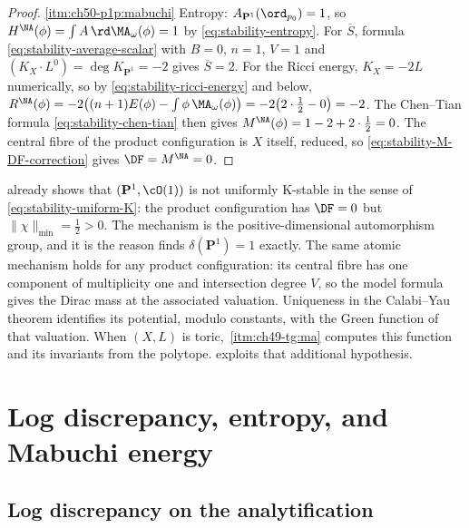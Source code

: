\begin{proof}
\cref{itm:ch50-p1p:mabuchi}  Entropy: $A_{\mathbf P^1}(\ord_{p_0})=1$, so
$H^{\NA}(\phi)=\int A\,\rd\MA_\omega(\phi)=1$ by
\eqref{eq:stability-entropy}.  For $\overline S$, formula
\eqref{eq:stability-average-scalar} with $B=0$, $n=1$, $V=1$ and
$(K_X\cdot L^{0})=\deg K_{\mathbf P^1}=-2$ gives
$\overline S=2$.  For the Ricci energy, $K_X=-2L$ numerically, so by
\eqref{eq:stability-ricci-energy} and
 below,
$R^{\NA}(\phi)=-2\bigl((n+1)E(\phi)-\int\phi\,\MA_\omega(\phi)\bigr)
=-2\bigl(2\cdot\tfrac12-0\bigr)=-2$.  The Chen--Tian formula
\eqref{eq:stability-chen-tian} then gives
$M^{\NA}(\phi)=1-2+2\cdot\tfrac12=0$.  The central fibre of the product
configuration is $X$ itself, reduced, so
\eqref{eq:stability-M-DF-correction} gives $\DF=M^{\NA}=0$.
\end{proof}

\begin{remark}
\label{rem:ch50-p1-obstruction}
 already shows that
$(\mathbf P^1,\cO(1))$ is not uniformly K-stable in the sense of
\eqref{eq:stability-uniform-K}: the product configuration has
$\DF=0$ but $\|\chi\|_{\min}=\tfrac12>0$.  The mechanism is the
positive-dimensional automorphism group, and it is the reason
 finds $\delta(\mathbf P^1)=1$ exactly.  The
same atomic mechanism holds for any product configuration: its central
fibre has one component of multiplicity one and intersection degree $V$,
so the model formula gives the Dirac mass at the associated valuation.
Uniqueness in the Calabi--Yau theorem identifies its potential, modulo
constants, with the Green function of that valuation.  When $(X,L)$ is
toric, \,\cref{itm:ch49-tg:ma} computes this
function and its invariants from the polytope.
 exploits that additional hypothesis.
\end{remark}

\section{Log discrepancy, entropy, and Mabuchi energy}
\label{sec:ch50-entropy}

\subsection{Log discrepancy on the analytification}
\label{sec:ch50-log-discrepancy}

